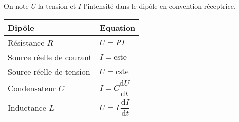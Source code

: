 \documentclass[a4paper]{article}
\begin{document}
\pagestyle{fancy}
\fancyhf{}
\setlength{\headheight}{15pt}

\begin{center}
	\large{}
\end{center}


On note \(U\) la tension et \(I\) l'intensité dans le dipôle en convention réceptrice.\\
\setlength{\tabcolsep}{15pt} 
\renewcommand{\arraystretch}{2.5} 
\begin{table}[h]
\centering
\begin{tabular}{l|l}
Dipôle                   & Equation \\ \hline
Résistance \(R\)             & \(U=RI\)     \\
Source réelle de courant & \(I=\mathrm{cste}\)   \\
Source réelle de tension & \(U=\mathrm{cste}\)   \\
Condensateur \(C\)           & \(I=C\dfrac{\mathrm{d}U}{\mathrm{d}t}\)      \\
Inductance \(L\)             & \(U=L\dfrac{\mathrm{d}I}{\mathrm{d}t}\)     
\end{tabular}
\end{table}
\end{document}
